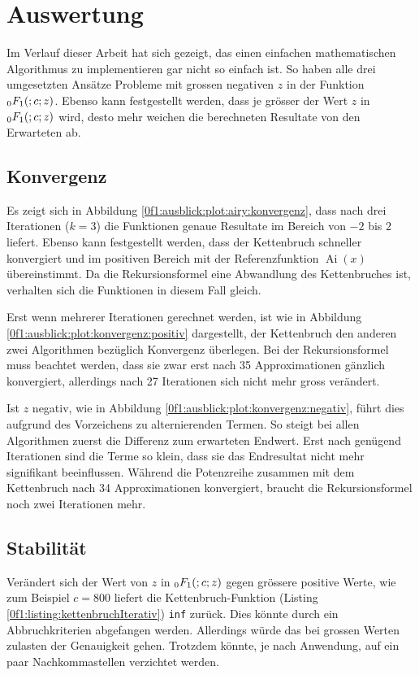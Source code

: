 %
%
%
\section{Auswertung
\label{0f1:section:teil3}}
Im Verlauf dieser Arbeit hat sich gezeigt, 
das einen einfachen mathematischen Algorithmus zu implementieren gar nicht so einfach ist.
So haben alle drei umgesetzten Ansätze Probleme mit grossen negativen $z$ in der Funktion $\mathstrut_0F_1(;c;z)$.
Ebenso kann festgestellt werden, dass je grösser der Wert $z$ in $\mathstrut_0F_1(;c;z)$ wird, desto mehr weichen die berechneten Resultate von den Erwarteten \cite{0f1:wolfram-0f1} ab.

\subsection{Konvergenz
\label{0f1:subsection:konvergenz}}
Es zeigt sich in Abbildung \ref{0f1:ausblick:plot:airy:konvergenz}, dass nach drei Iterationen ($k = 3$) die Funktionen genaue Resultate im Bereich von $-2$ bis $2$ liefert. Ebenso kann festgestellt werden, dass der Kettenbruch schneller konvergiert und im positiven Bereich mit der Referenzfunktion $\operatorname{Ai}(x)$ übereinstimmt. Da die Rekursionsformel eine Abwandlung des Kettenbruches ist, verhalten sich die Funktionen in diesem Fall gleich.

Erst wenn mehrerer Iterationen gerechnet werden, ist wie in Abbildung \ref{0f1:ausblick:plot:konvergenz:positiv} dargestellt, der Kettenbruch den anderen zwei Algorithmen bezüglich Konvergenz überlegen. Bei der Rekursionsformel muss beachtet werden, dass sie zwar erst nach 35 Approximationen gänzlich konvergiert, allerdings nach 27 Iterationen sich nicht mehr gross verändert.

Ist $z$ negativ, wie in Abbildung \ref{0f1:ausblick:plot:konvergenz:negativ}, führt dies aufgrund des Vorzeichens zu alternierenden Termen. So steigt bei allen Algorithmen zuerst die Differenz zum erwarteten Endwert. Erst nach genügend Iterationen sind die Terme so klein, dass sie das Endresultat nicht mehr signifikant beeinflussen. Während die Potenzreihe zusammen mit dem Kettenbruch nach 34 Approximationen konvergiert, braucht die Rekursionsformel noch zwei Iterationen mehr.  


\subsection{Stabilität
\label{0f1:subsection:Stabilitaet}}
Verändert sich der Wert von $z$ in $\mathstrut_0F_1(;c;z)$ gegen grössere positive Werte, wie zum Beispiel $c = 800$ liefert die Kettenbruch-Funktion (Listing \ref{0f1:listing:kettenbruchIterativ}) \verb+inf+ zurück. Dies könnte durch ein Abbruchkriterien abgefangen werden. Allerdings würde das bei grossen Werten zulasten der Genauigkeit gehen. Trotzdem könnte, je nach Anwendung, auf ein paar Nachkommastellen verzichtet werden.

